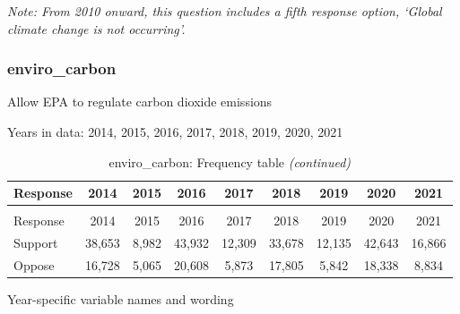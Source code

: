 \documentclass[
  12pt]{article}
\begin{document}
\emph{Note: From 2010 onward, this question includes a fifth response
option, `Global climate change is not occurring'.}

\hypertarget{enviro_carbon}{%
\subsubsection{enviro\_carbon}\label{enviro_carbon}}

Allow EPA to regulate carbon dioxide emissions

Years in data: 2014, 2015, 2016, 2017, 2018, 2019, 2020,
2021\begingroup\fontsize{10}{12}\selectfont

\begin{longtable}[t]{lcccccccc}
\caption{\label{tab:unnamed-chunk-5}enviro\_carbon: Frequency table}\\
\toprule
Response & 2014 & 2015 & 2016 & 2017 & 2018 & 2019 & 2020 & 2021\\
\midrule
\endfirsthead
\caption[]{enviro\_carbon: Frequency table \textit{(continued)}}\\
\toprule
Response & 2014 & 2015 & 2016 & 2017 & 2018 & 2019 & 2020 & 2021\\
\midrule
\endhead

\endfoot
\bottomrule
\endlastfoot
Support & 38,653 & 8,982 & 43,932 & 12,309 & 33,678 & 12,135 & 42,643 & 16,866\\
Oppose & 16,728 & 5,065 & 20,608 & 5,873 & 17,805 & 5,842 & 18,338 & 8,834\\*
\end{longtable}
\endgroup{}

Year-specific variable names and
wording\begingroup\fontsize{11}{13}\selectfont
\end{document}
